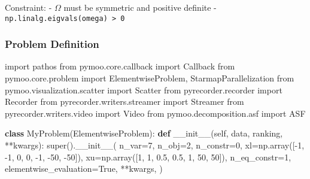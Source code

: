 \documentclass[
  authoryear,
  preprint,
  3p]{elsarticle}
\newenvironment{Shaded}{\begin{snugshade}}{\end{snugshade}}
\newcommand{\BuiltInTok}[1]{\textcolor[rgb]{0.00,0.23,0.31}{#1}}
\newcommand{\DecValTok}[1]{\textcolor[rgb]{0.68,0.00,0.00}{#1}}
\newcommand{\FloatTok}[1]{\textcolor[rgb]{0.68,0.00,0.00}{#1}}
\newcommand{\FunctionTok}[1]{\textcolor[rgb]{0.28,0.35,0.67}{#1}}
\newcommand{\ImportTok}[1]{\textcolor[rgb]{0.00,0.46,0.62}{#1}}
\newcommand{\KeywordTok}[1]{\textcolor[rgb]{0.00,0.23,0.31}{\textbf{#1}}}
\newcommand{\NormalTok}[1]{\textcolor[rgb]{0.00,0.23,0.31}{#1}}
\newcommand{\OperatorTok}[1]{\textcolor[rgb]{0.37,0.37,0.37}{#1}}
\newcommand{\VariableTok}[1]{\textcolor[rgb]{0.07,0.07,0.07}{#1}}
\begin{document}
Constraint: - \(\Omega\) must be symmetric and positive definite -
\texttt{np.linalg.eigvals(omega)\ \textgreater{}\ 0}

\subsubsection{Problem Definition}\label{problem-definition}

\begin{Shaded}
\begin{Highlighting}[]
\ImportTok{import}\NormalTok{ pathos}
\ImportTok{from}\NormalTok{ pymoo.core.callback }\ImportTok{import}\NormalTok{ Callback}
\ImportTok{from}\NormalTok{ pymoo.core.problem }\ImportTok{import}\NormalTok{ ElementwiseProblem, StarmapParallelization}
\ImportTok{from}\NormalTok{ pymoo.visualization.scatter }\ImportTok{import}\NormalTok{ Scatter}
\ImportTok{from}\NormalTok{ pyrecorder.recorder }\ImportTok{import}\NormalTok{ Recorder}
\ImportTok{from}\NormalTok{ pyrecorder.writers.streamer }\ImportTok{import}\NormalTok{ Streamer}
\ImportTok{from}\NormalTok{ pyrecorder.writers.video }\ImportTok{import}\NormalTok{ Video}
\ImportTok{from}\NormalTok{ pymoo.decomposition.asf }\ImportTok{import}\NormalTok{ ASF}


\KeywordTok{class}\NormalTok{ MyProblem(ElementwiseProblem):}
    \KeywordTok{def} \FunctionTok{\_\_init\_\_}\NormalTok{(}\VariableTok{self}\NormalTok{, data, ranking, }\OperatorTok{**}\NormalTok{kwargs):}
        \BuiltInTok{super}\NormalTok{().}\FunctionTok{\_\_init\_\_}\NormalTok{(}
\NormalTok{            n\_var}\OperatorTok{=}\DecValTok{7}\NormalTok{,}
\NormalTok{            n\_obj}\OperatorTok{=}\DecValTok{2}\NormalTok{,}
\NormalTok{            n\_constr}\OperatorTok{=}\DecValTok{0}\NormalTok{,}
\NormalTok{            xl}\OperatorTok{=}\NormalTok{np.array([}\OperatorTok{{-}}\DecValTok{1}\NormalTok{, }\OperatorTok{{-}}\DecValTok{1}\NormalTok{, }\DecValTok{0}\NormalTok{, }\DecValTok{0}\NormalTok{, }\OperatorTok{{-}}\DecValTok{1}\NormalTok{, }\OperatorTok{{-}}\DecValTok{50}\NormalTok{, }\OperatorTok{{-}}\DecValTok{50}\NormalTok{]),}
\NormalTok{            xu}\OperatorTok{=}\NormalTok{np.array([}\DecValTok{1}\NormalTok{, }\DecValTok{1}\NormalTok{, }\FloatTok{0.5}\NormalTok{, }\FloatTok{0.5}\NormalTok{, }\DecValTok{1}\NormalTok{, }\DecValTok{50}\NormalTok{, }\DecValTok{50}\NormalTok{]),}
\NormalTok{            n\_eq\_constr}\OperatorTok{=}\DecValTok{1}\NormalTok{,}
\NormalTok{            elementwise\_evaluation}\OperatorTok{=}\VariableTok{True}\NormalTok{,}
            \OperatorTok{**}\NormalTok{kwargs,}
\NormalTok{        )}


\end{Highlighting}
\end{Shaded}
\end{document}
